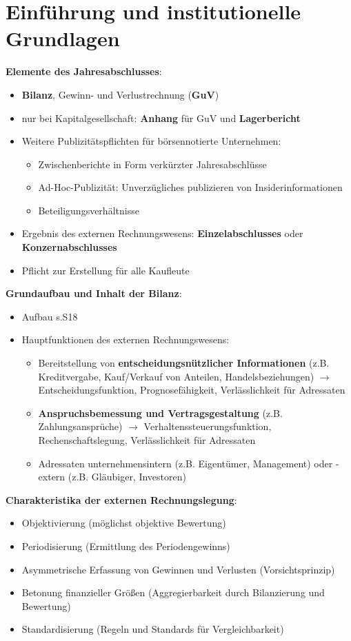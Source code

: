 \section{Einführung und institutionelle Grundlagen}

\textbf{Elemente des Jahresabschlusses}: 
\begin{itemize}
	\item \textbf{Bilanz}, Gewinn- und Verlustrechnung (\textbf{GuV})
	\item nur bei Kapitalgesellschaft: \textbf{Anhang} für GuV und \textbf{Lagerbericht}
	\item Weitere Publizitätspflichten für börsennotierte Unternehmen:
	\begin{itemize}
		\item Zwischenberichte in Form verkürzter Jahresabschlüsse
		\item Ad-Hoc-Publizität: Unverzügliches publizieren von Insiderinformationen
		\item Beteiligungsverhältnisse
	\end{itemize}
	\item Ergebnis des externen Rechnungswesens: \textbf{Einzelabschlusses} oder \textbf{Konzernabschlusses}
	\item Pflicht zur Erstellung für alle Kaufleute
\end{itemize}
\bigskip
\textbf{Grundaufbau und Inhalt der Bilanz}:
\begin{itemize}
	\item Aufbau s.S18
	\item Hauptfunktionen des externen Rechnungswesens: 
	\begin{itemize}
		\item Bereitstellung von \textbf{entscheidungsnützlicher Informationen} (z.B. Kreditvergabe, Kauf/Verkauf von Anteilen, Handelsbeziehungen) $\rightarrow$ Entscheidungsfunktion, Prognosefähigkeit, Verlässlichkeit für Adressaten
		\item \textbf{Anspruchsbemessung und Vertragsgestaltung} (z.B. Zahlungsansprüche) $\rightarrow$ Verhaltenssteuerungsfunktion, Rechenschaftslegung, Verlässlichkeit für Adressaten
		\item Adressaten unternehmensintern (z.B. Eigentümer, Management) oder -extern (z.B. Gläubiger, Investoren)
	\end{itemize} 
\end{itemize}
\bigskip
\textbf{Charakteristika der externen Rechnungslegung}:
\begin{itemize}
	\item Objektivierung (möglichst objektive Bewertung)
	\item Periodisierung (Ermittlung des Periodengewinns)
	\item Asymmetrische Erfassung von Gewinnen und Verlusten (Vorsichtsprinzip)
	\item Betonung finanzieller Größen (Aggregierbarkeit durch Bilanzierung und Bewertung)
	\item Standardisierung (Regeln und Standards für Vergleichbarkeit)
\end{itemize}
